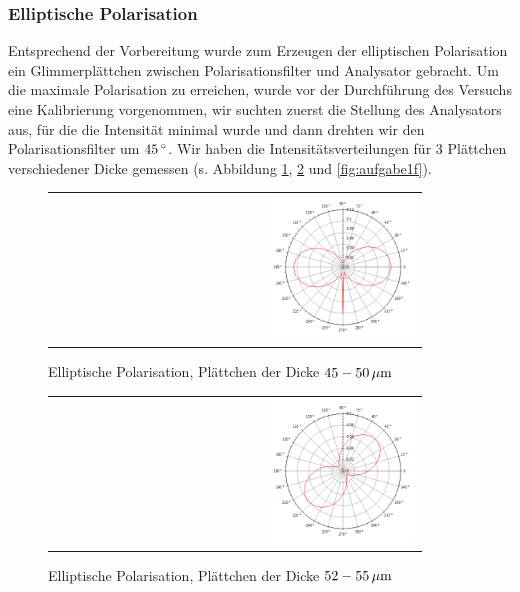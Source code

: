 \documentclass[a4paper,titlepage]{scrartcl}
\numberwithin{equation}{section}
\begin{document}
\subsubsection{Elliptische Polarisation}
Entsprechend der Vorbereitung wurde zum Erzeugen der elliptischen Polarisation ein Glimmerplättchen zwischen Polarisationsfilter und Analysator gebracht. Um die maximale Polarisation zu erreichen, wurde vor der Durchführung des Versuchs eine Kalibrierung vorgenommen, wir suchten zuerst die Stellung des Analysators aus, für die die Intensität minimal wurde und dann drehten wir den Polarisationsfilter um $\unit[45]{^\circ}$. Wir haben die Intensitätsverteilungen für 3 Plättchen verschiedener Dicke gemessen (s. Abbildung \ref{fig:aufgabe1d}, \ref{fig:aufgabe1e} und \ref{fig:aufgabe1f}).
\begin{figure}[H]
	\centering
	\begin{tabular}{@{}r@{}}
		\includegraphics[width=0.4\textwidth]{bilder/1d.png}\\
	\end{tabular}
	\caption{Elliptische Polarisation, Plättchen der Dicke $\unit[45-50]{\mu m}$}
	\label{fig:aufgabe1d}
\end{figure}
\begin{figure}[H]
	\centering
	\begin{tabular}{@{}r@{}}
		\includegraphics[width=0.4\textwidth]{bilder/1e.png}\\
	\end{tabular}
	\caption{Elliptische Polarisation, Plättchen der Dicke $\unit[52-55]{\mu m}$}
	\label{fig:aufgabe1e}
\end{figure}
\end{document}
